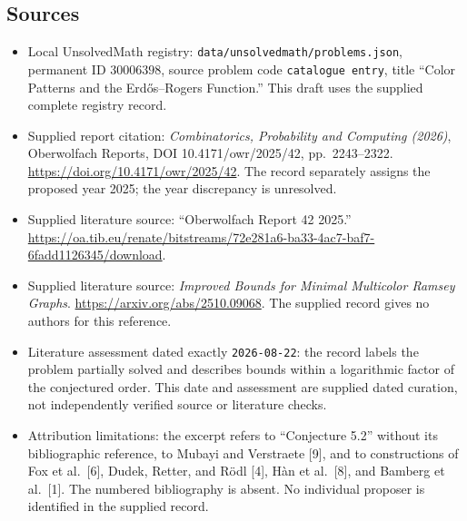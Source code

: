 \documentclass[11pt]{article}
\begin{document}
\subsection{Sources}
\begin{itemize}
\item Local UnsolvedMath registry: \texttt{data/unsolvedmath/problems.json}, permanent ID \(30006398\), source problem code \texttt{catalogue entry}, title ``Color Patterns and the Erd\H{o}s--Rogers Function.'' This draft uses the supplied complete registry record.
\item Supplied report citation: \emph{Combinatorics, Probability and Computing (2026)}, Oberwolfach Reports, DOI 10.4171/owr/2025/42, pp.~2243--2322. \url{https://doi.org/10.4171/owr/2025/42}. The record separately assigns the proposed year 2025; the year discrepancy is unresolved.
\item Supplied literature source: ``Oberwolfach Report 42 2025.'' \url{https://oa.tib.eu/renate/bitstreams/72e281a6-ba33-4ac7-baf7-6fadd1126345/download}.
\item Supplied literature source: \emph{Improved Bounds for Minimal Multicolor Ramsey Graphs}. \url{https://arxiv.org/abs/2510.09068}. The supplied record gives no authors for this reference.
\item Literature assessment dated exactly \texttt{2026-08-22}: the record labels the problem partially solved and describes bounds within a logarithmic factor of the conjectured order. This date and assessment are supplied dated curation, not independently verified source or literature checks.
\item Attribution limitations: the excerpt refers to ``Conjecture 5.2'' without its bibliographic reference, to Mubayi and Verstraete [9], and to constructions of Fox et al.\ [6], Dudek, Retter, and R\"odl [4], H\`an et al.\ [8], and Bamberg et al.\ [1]. The numbered bibliography is absent. No individual proposer is identified in the supplied record.
\end{itemize}
\end{document}
